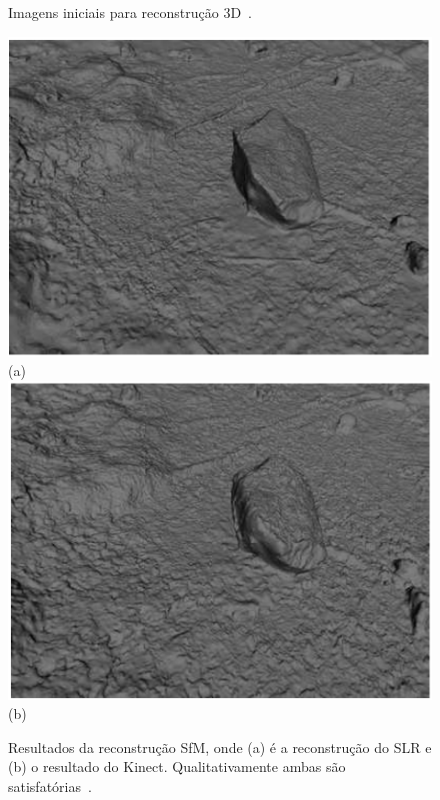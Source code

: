 \begin{figure}[!h]
	\centering
	\caption{%
	Imagens iniciais para reconstrução 3D~\cite{smisek20133d}.
	}\label{fig:resultadoKinect1}
\end{figure}

\newpage

\begin{figure}[!h]
	\centering
	\includegraphics[width=0.3\linewidth]{figs/imagemMVS.png}(a)
	\includegraphics[width=0.3\linewidth]{figs/imagemMVSKinect.png}(b)
	\caption{%
	Resultados da reconstrução SfM, onde (a) é a reconstrução do SLR e (b) o resultado do Kinect. Qualitativamente ambas são satisfatórias~\cite{smisek20133d}.
	}\label{fig:resultadoKinect2}
\end{figure}

